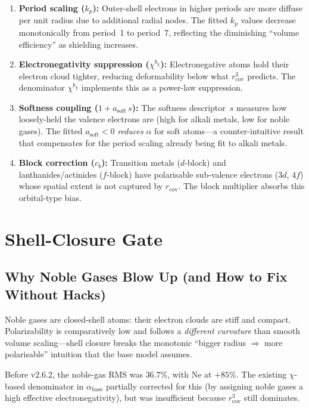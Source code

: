 \documentclass[11pt,letterpaper]{article}
\newcommand{\rcov}{r_{\mathrm{cov}}}
\newcommand{\kp}{k_p}
\newcommand{\cb}{c_b}
\newcommand{\asoft}{a_{\mathrm{soft}}}
\newcommand{\bchi}{b_\chi}
\begin{document}
\begin{enumerate}
\item \textbf{Period scaling ($\kp$):}  Outer-shell electrons in higher
  periods are more diffuse per unit radius due to additional radial nodes.
  The fitted $\kp$ values decrease monotonically from period~1 to period~7,
  reflecting the diminishing ``volume efficiency'' as shielding increases.

\item \textbf{Electronegativity suppression ($\chi^{\bchi}$):}
  Electronegative atoms hold their electron cloud tighter, reducing
  deformability below what $\rcov^3$ predicts.  The denominator
  $\chi^{\bchi}$ implements this as a power-law suppression.

\item \textbf{Softness coupling ($1 + \asoft\,s$):}  The softness
  descriptor~$s$ measures how loosely-held the valence electrons are
  (high for alkali metals, low for noble gases).  The fitted
  $\asoft < 0$ \emph{reduces} $\alpha$ for soft atoms---a counter-intuitive
  result that compensates for the period scaling already being fit to
  alkali metals.

\item \textbf{Block correction ($\cb$):}  Transition metals ($d$-block)
  and lanthanides/actinides ($f$-block) have polarisable sub-valence
  electrons ($3d$, $4f$) whose spatial extent is not captured by $\rcov$.
  The block multiplier absorbs this orbital-type bias.
\end{enumerate}

\section{Shell-Closure Gate}
\label{sec:shell}

\subsection{Why Noble Gases Blow Up (and How to Fix Without Hacks)}

Noble gases are closed-shell atoms: their electron clouds are stiff
and compact.  Polarizability is comparatively low and follows a
\emph{different curvature} than smooth volume scaling---shell closure
breaks the monotonic ``bigger radius $\Rightarrow$ more polarisable''
intuition that the base model assumes.

Before v2.6.2, the noble-gas RMS was $36.7\%$, with Ne at $+85\%$.
The existing $\chi$-based denominator in $\alpha_{\text{base}}$ partially
corrected for this (by assigning noble gases a high effective
electronegativity), but was insufficient because $\rcov^3$ still
dominates.
\end{document}
